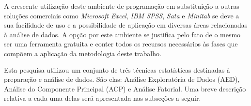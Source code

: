 A crescente utilização deste ambiente de programação em substituição a outras soluções comerciais como \textit{Microsoft Excel}, \textit{IBM SPSS}, \textit{Sata} e \textit{Minitab} se deve a sua facilidade de uso e a possibilidade de aplicação em diversas áreas relacionadas à análise de dados. A opção por este ambiente se justifica pelo fato de o mesmo ser uma ferramenta gratuita e conter todos os recursos necessários às fases que compõem a aplicação da metodologia deste trabalho.

Esta pesquisa utilizou um conjunto de três técnicas estatísticas destinadas à preparação e análise de dados. São elas: Análise Exploratória de Dados (AED), Análise do Componente Principal (ACP) e Análise Fatorial. Uma breve descrição relativa a cada uma delas será apresentada nas subseções a seguir.



